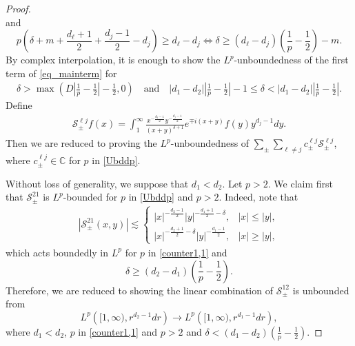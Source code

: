 \documentclass[12pt]{amsart}
\newcommand\C{\mathbb{C}}
\begin{document}
\begin{proof}
\begin{equation}
\end{equation}
and 
\begin{equation}\label{BBR2}
    p \left( \delta+m+\frac{d_\ell+1}{2}+\frac{d_j-1}{2} - d_j \right) \ge d_\ell-d_j \iff \delta \ge (d_\ell-d_j)\left( \frac{1}{p} - \frac{1}{2} \right) - m.
\end{equation}
By complex interpolation, it is enough to show the $L^p$-unboundedness of the first term of \eqref{eq_mainterm} for 
\begin{align}\label{Ubddp}
    \delta > \max \left( D\left|\frac{1}{p}-\frac{1}{2}\right|-\frac{1}{2}, 0 \right) \quad \textrm{and} \quad |d_1-d_2| \left|\frac{1}{p}-\frac{1}{2}\right| - 1 \le \delta < |d_1-d_2| \left|\frac{1}{p}-\frac{1}{2}\right|.
\end{align}
Define
\begin{align}
    \mathcal{S}_{\pm}^{\ell j}f(x) = \int_1^\infty \frac{x^{-\frac{d_\ell-1}{2}} y^{-\frac{d_j-1}{2}}}{(x+y)^{\delta+1}} e^{\mp i(x+y)} f(y) y^{d_j-1} dy.
\end{align}
Then we are reduced to proving the  $L^p$-unboundedness of $\sum_{\pm}\sum_{\ell \ne j}c_{\pm}^{\ell j}\mathcal{S}_{\pm}^{\ell j}$, where $c_{\pm}^{\ell j}\in \C$ for $p$ in \eqref{Ubddp}.

Without loss of generality, we suppose that $d_1<d_2$. Let $p>2$. We claim first that $\mathcal{S}_{\pm}^{21}$ is $L^p$-bounded for $p$ in \eqref{Ubddp} and $p>2$. Indeed, note that
\begin{align*}
    |\mathcal{S}_{\pm}^{21}(x,y)| \lesssim \begin{cases}
    |x|^{-\frac{d_2-1}{2}} |y|^{-\frac{d_1+1}{2}-\delta}, & |x|\le |y|,\\
        |x|^{-\frac{d_2+1}{2}-\delta} |y|^{-\frac{d_1-1}{2}}, & |x|\ge |y|,
    \end{cases}
\end{align*}
which acts boundedly in $L^p$ for $p$ in \eqref{counter1,1} and 
\begin{equation*}
    \delta \ge (d_2-d_1)\left(\frac{1}{p}-\frac{1}{2}\right).
\end{equation*}
Therefore, we are reduced to showing the linear combination of $\mathcal{S}_{\pm}^{12}$ is unbounded from 
$$L^p\left( [1,\infty), r^{d_2-1}dr \right) \to L^p\left( [1,\infty), r^{d_1-1}dr \right),
$$
where $d_1<d_2$, $p$ in \eqref{counter1,1} and $p>2$ and $\delta< (d_1-d_2)\left(\frac{1}{p}-\frac{1}{2}\right)$.



\end{proof}
\end{document}
